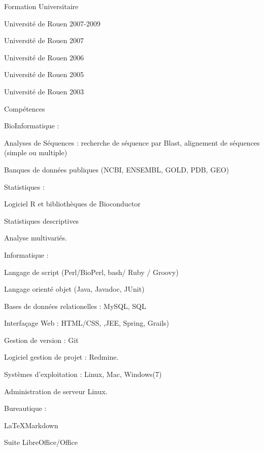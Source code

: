 \documentclass[a4paper, 11pt]{article}
\begin{document}
\begin{Section}{Formation Universitaire}

{Université de Rouen}
{ }
{2007-2009}

{Université de Rouen}
{ }
{2007}

{Université de Rouen}
{ }
{2006}

{Université de Rouen}
{ }
{2005}

{Université de Rouen}
{ }
{2003}

\end{Section}
\begin{Section}{Compétences}
 
\SubPoint BioInformatique :
\begin{List}
\item Analyses de Séquences : recherche de séquence par Blast, alignement de séquences (simple ou multiple)
\item Banques de données publiques (NCBI, ENSEMBL, GOLD, PDB, GEO) 	
\end{List}

\SubPoint Statistiques :
\begin{List}
\item Logiciel R et bibliothèques de Bioconductor
\item Statistiques descriptives
\item Analyse multivariés.
\end{List}	

\SubPoint Informatique :  
\begin{List}
\item Langage de script (Perl/BioPerl, bash/ Ruby / Groovy)
\item Langage orienté objet (Java, Javadoc, JUnit) 
\item Bases de données relationelles : MySQL, SQL  
\item Interfaçage Web : HTML/CSS, ,JEE, Spring, Grails)
\item Gestion de version : Git
\item Logiciel gestion de projet : Redmine.
\item Systèmes d'exploitation : Linux, Mac, Windows(7)	
\item Administration de serveur Linux.
\end{List}

\SubPoint Bureautique :
\begin{List}
\item {\LaTeX Markdown}
\item Suite LibreOffice/Office
\end{List}

\end{Section}
\end{document}
